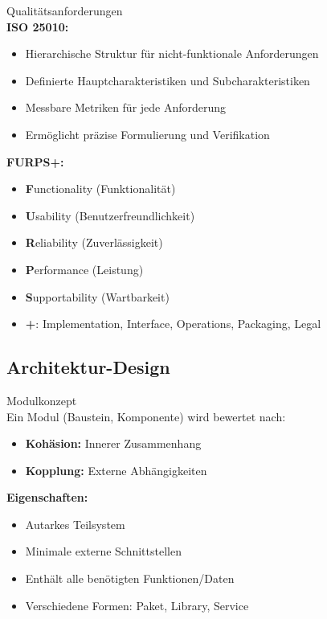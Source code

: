\begin{theorem}{Qualitätsanforderungen}\\
\textbf{ISO 25010:}
\begin{itemize}
    \item Hierarchische Struktur für nicht-funktionale Anforderungen
    \item Definierte Hauptcharakteristiken und Subcharakteristiken
    \item Messbare Metriken für jede Anforderung
    \item Ermöglicht präzise Formulierung und Verifikation
\end{itemize}

\textbf{FURPS+:}
\begin{itemize}
    \item \textbf{F}unctionality (Funktionalität)
    \item \textbf{U}sability (Benutzerfreundlichkeit)
    \item \textbf{R}eliability (Zuverlässigkeit)
    \item \textbf{P}erformance (Leistung)
    \item \textbf{S}upportability (Wartbarkeit)
    \item \textbf{+}: Implementation, Interface, Operations, Packaging, Legal
\end{itemize}
\end{theorem}

\columnbreak

\subsection{Architektur-Design}

\begin{concept}{Modulkonzept}\\
Ein Modul (Baustein, Komponente) wird bewertet nach:
\begin{itemize}
    \item \textbf{Kohäsion:} Innerer Zusammenhang
    \item \textbf{Kopplung:} Externe Abhängigkeiten
\end{itemize}

\textbf{Eigenschaften:}
\begin{itemize}
    \item Autarkes Teilsystem
    \item Minimale externe Schnittstellen
    \item Enthält alle benötigten Funktionen/Daten
    \item Verschiedene Formen: Paket, Library, Service
\end{itemize}
\end{concept}

